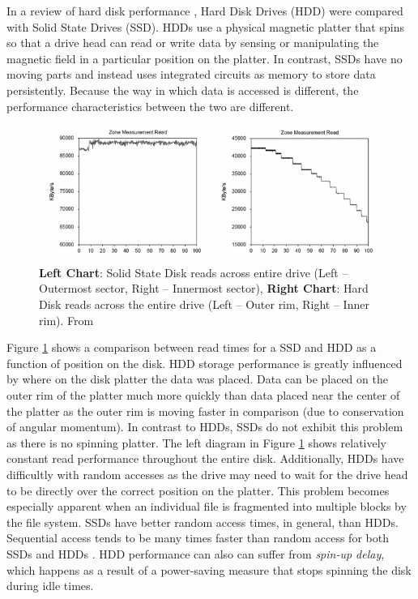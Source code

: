 \documentclass[10pt,letter]{article}
\begin{document}
In a review of hard disk performance \cite{disk-perf}, Hard Disk Drives (HDD) were compared with Solid State Drives (SSD). HDDs use a physical magnetic platter that spins so that a drive head can read or write data by sensing or manipulating the magnetic field in a particular position on the platter. In contrast, SSDs have no moving parts and instead uses integrated circuits as memory to store data persistently. Because the way in which data is accessed is different, the performance characteristics between the two are different.

\begin{figure}
\centering
\includegraphics[width=\textwidth]{disk-perf}
\caption{{\bf Left Chart}: Solid State Disk reads across entire drive (Left -- Outermost sector, Right -- Innermost sector), {\bf Right Chart}: Hard Disk reads across the entire drive (Left -- Outer rim, Right -- Inner rim). From \cite{disk-perf}}
\label{fig:hdd-vs-sdd}
\end{figure}

Figure \ref{fig:hdd-vs-sdd} shows a comparison between read times for
a SSD and HDD as a function of position on the disk. HDD storage
performance is greatly influenced by where on the disk platter the
data was placed. Data can be placed on the outer rim of the platter
much more quickly than data placed near the center of the platter as
the outer rim is moving faster in comparison (due to conservation of
angular momentum). In contrast to HDDs, SSDs do not exhibit this
problem as there is no spinning platter. The left diagram in Figure
\ref{fig:hdd-vs-sdd} shows relatively constant read performance
throughout the entire disk. Additionally, HDDs have difficultly with
random accesses as the drive may need to wait for the drive head to be
directly over the correct position on the platter. This problem
becomes especially apparent when an individual file is fragmented into
multiple blocks by the file system. SSDs have better random access
times, in general, than HDDs. Sequential access tends to be many times
faster than random access for both SSDs and HDDs \cite{disk-perf}. HDD
performance can also can suffer from {\em spin-up delay}, which
happens as a result of a power-saving measure that stops spinning the
disk during idle times.
\end{document}
